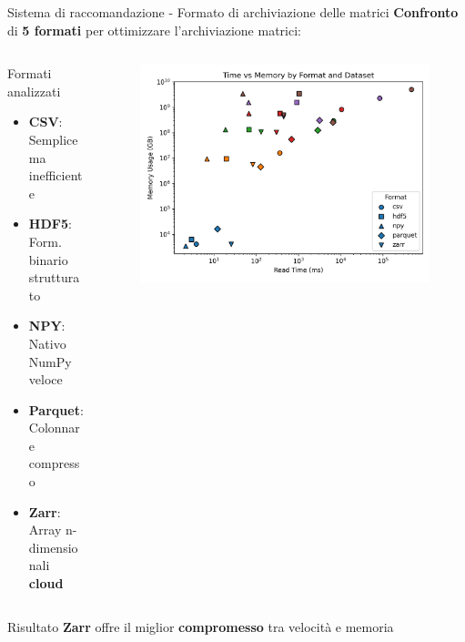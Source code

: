 \documentclass{beamer}
\begin{document}
	\begin{frame}{Sistema di raccomandazione - Formato di archiviazione delle matrici}
        \textbf{Confronto} di \textbf{5 formati} per ottimizzare l'archiviazione matrici:

		\begin{columns}
			\begin{column}{0.6\textwidth}
				\begin{block}{Formati analizzati}
					\begin{itemize}
						\item \textbf{CSV}: Semplice ma inefficiente
						\item \textbf{HDF5}: Form. binario strutturato
						\item \textbf{NPY}: Nativo NumPy veloce
						\item \textbf{Parquet}: Colonnare compresso
						\item \textbf{Zarr}: Array n-dimensionali \textbf{cloud}
					\end{itemize}
				\end{block}
			\end{column}
			\begin{column}{0.4\textwidth}
				\begin{figure}
					\centering
					\includegraphics[width=\textwidth]{time_vs_memory.png}
				\end{figure}
			\end{column}
		\end{columns}

		\begin{alertblock}{Risultato}
			\textbf{Zarr} offre il miglior \textbf{compromesso} tra velocità e memoria
		\end{alertblock}
	\end{frame}
\end{document}
